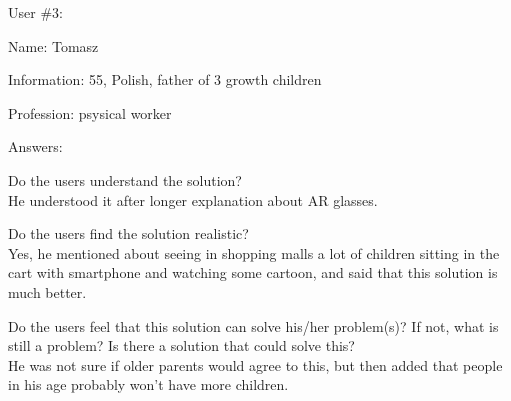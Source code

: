 \documentclass[a4paper,10pt,oneside]{scrreprt}
\begin{document}
User \#3:
\begin{compactitem}
	\item Name: Tomasz
	\item Information: 55, Polish, father of 3 growth children
	\item Profession: psysical worker
\end{compactitem}
\bigskip

Answers:
\begin{compactitem}
	\item Do the users understand the solution?\\
	He understood it after longer explanation about AR glasses.

	\item Do the users find the solution realistic?\\
	Yes, he mentioned about seeing in shopping malls a lot of children sitting in the cart with smartphone and watching some cartoon, and said that this solution is much better.\\

	\item Do the users feel that this solution can solve his/her problem(s)? If not, what is still
	a problem? Is there a solution that could solve this?\\
	He was not sure if older parents would agree to this, but then added that people in his age probably won't have more children.
\end{compactitem}

\clearpage


				
\end{document}
